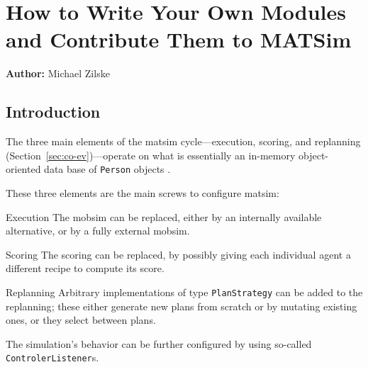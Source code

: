 \chapter{How to Write Your Own Modules and Contribute Them to MATSim}
\label{ch:extensionpoints}
\hfill \textbf{Author:} Michael Zilske

\section{Introduction}
\label{sec:ownmodules-intro}
The three main elements of the \gls{matsim} cycle---execution, scoring, and \gls{replanning} (Section~\ref{sec:co-ev})---operate on what is essentially an in-memory object-oriented data base of \lstinline|Person| objects \citep{RaneyNagel2006traf-framework}.

These three elements are the main screws to configure \gls{matsim}:
\begin{compactitem}
\item[Execution] The \gls{mobsim} can be replaced, either by an internally available alternative, or by a fully external \gls{mobsim}.
\item[Scoring] The scoring can be replaced, by possibly giving each individual agent a different recipe to compute its score.
\item[Replanning] Arbitrary implementations of type \lstinline|PlanStrategy| can be added to the \gls{replanning}; these either generate new plans from scratch or by mutating existing ones, or they select between plans.
\end{compactitem}
%
The simulation's behavior can be further configured by using so-called \lstinline|ControlerListener|s.

